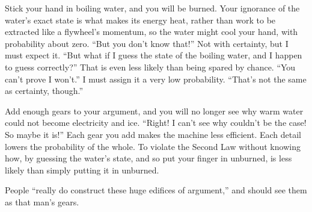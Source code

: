 Stick your hand in boiling water, and you will be burned. Your ignorance of the water's exact state is what makes its energy heat, rather than work to be extracted like a flywheel's momentum, so the water might cool your hand, with probability about zero.  ``But you don't know that!'' Not with certainty, but I must expect it. ``But what if I guess the state of the boiling water, and I happen to guess correctly?'' That is even less likely than being spared by chance. ``You can't prove I won't.'' I must assign it a very low probability. ``That's not the same as certainty, though.''

Add enough gears to your argument, and you will no longer see why warm water could not become electricity and ice. ``Right! I can't see why couldn't be the case! So maybe it is!'' Each gear you add makes the machine less efficient. Each detail lowers the probability of the whole. To violate the Second Law without knowing how, by guessing the water's state, and so put your finger in unburned, is less likely than simply putting it in unburned.

People ``really do construct these huge edifices of argument,'' and should see them as that man's gears.
